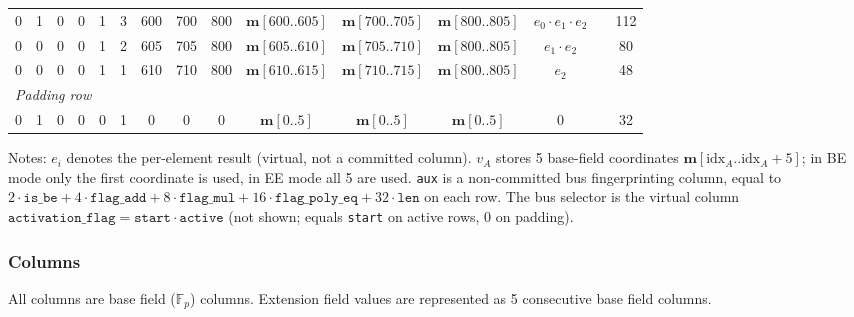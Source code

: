 \documentclass{article}
\theoremstyle{definition}
\newcommand{\Fp}{\mathbb F_p}
\begin{document}
{\begin{tabular}{ccccccccccccccc}
0 & 1 & 0 & 0 & 1 & 3 & 600 & 700 & 800 & $\textbf{m}[600..605]$ & $\textbf{m}[700..705]$ & $\textbf{m}[800..805]$ & $e_0 \cdot e_1 \cdot e_2$ & & 112 \\
0 & 0 & 0 & 0 & 1 & 2 & 605 & 705 & 800 & $\textbf{m}[605..610]$ & $\textbf{m}[705..710]$ & $\textbf{m}[800..805]$ & $e_1 \cdot e_2$           & & 80 \\
0 & 0 & 0 & 0 & 1 & 1 & 610 & 710 & 800 & $\textbf{m}[610..615]$ & $\textbf{m}[710..715]$ & $\textbf{m}[800..805]$ & $e_2$                     & & 48 \\
\midrule
\multicolumn{15}{l}{\textit{Padding row}} \\[2pt]
0 & 1 & 0 & 0 & 0 & 1 & 0   & 0   & 0   & $\textbf{m}[0..5]$ & $\textbf{m}[0..5]$ & $\textbf{m}[0..5]$ & 0 & & 32 \\
\bottomrule
\end{tabular}%
}

\vspace{3mm}

Notes: $e_i$ denotes the per-element result (virtual, not a committed column). $v_A$ stores 5 base-field coordinates $\textbf{m}[\text{idx}_A..\text{idx}_A\!+\!5]$; in BE mode only the first coordinate is used, in EE mode all 5 are used. \texttt{aux} is a non-committed bus fingerprinting column, equal to $2 \cdot \texttt{is\_be} + 4 \cdot \texttt{flag\_add} + 8 \cdot \texttt{flag\_mul} + 16 \cdot \texttt{flag\_poly\_eq} + 32 \cdot \texttt{len}$ on each row. The bus selector is the virtual column $\texttt{activation\_flag} = \texttt{start} \cdot \texttt{active}$ (not shown; equals \texttt{start} on active rows, 0 on padding).

\subsubsection{Columns}


\vspace{3mm}

All columns are base field ($\Fp$) columns. Extension field values are represented as 5 consecutive base field columns.

\vspace{2mm}
\end{document}
